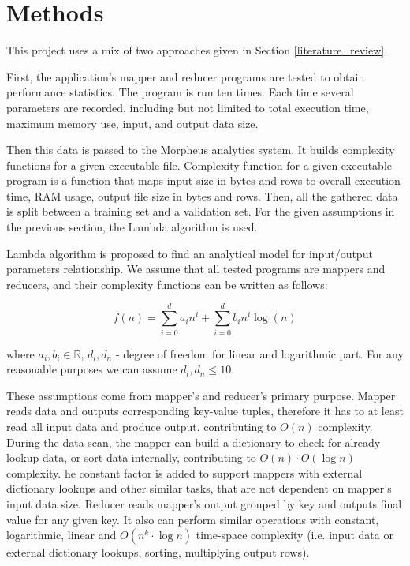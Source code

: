 \documentclass[conference]{IEEEtran} \IEEEoverridecommandlockouts
\begin{document}
    \section{Methods} 

    This project uses a mix of two approaches given in Section 
    \ref{literature_review}.

    First, the application's mapper and reducer programs are tested to obtain
    performance statistics. The program is run ten times. Each time several
    parameters are recorded, including but not limited to total execution time,
    maximum memory use, input, and output data size.

    Then this data is passed to the Morpheus analytics system. It builds
    complexity functions for a given executable file. Complexity function for a
    given executable program is a function that maps input size in bytes and
    rows to overall execution time, RAM usage, output file size in bytes and
    rows. Then, all the gathered data is split between a training set and a
    validation set. For the given assumptions in the previous section, the
    Lambda algorithm is used.

    Lambda algorithm is proposed to find an analytical model for input/output
    parameters relationship. We assume that all tested programs are mappers and
    reducers, and their complexity functions can be written as follows:
    
    \begin{equation} 
        f(n) = \sum_{i = 0}^d a_in^i + \sum_{i=0}^d b_in^i\log(n)
    \end{equation} 
    
    where $a_i, b_i \in \mathbb{R}$, $d_l, d_n$ - degree of freedom for linear 
    and logarithmic part. For any reasonable purposes we can assume 
    $d_l, d_n \leqslant 10$. 

    These assumptions come from mapper's and reducer's primary purpose. Mapper
    reads data and outputs corresponding key-value tuples, therefore it has to
    at least read all input data and produce output, contributing to $O(n)$
    complexity.  During the data scan, the mapper can build a dictionary to
    check for already lookup data, or sort data internally, contributing to
    $O(n)\cdot O(\log n)$ complexity.  he constant factor is added to support
    mappers with external dictionary lookups and other similar tasks, that are
    not dependent on mapper's input data size. Reducer reads mapper's output
    grouped by key and outputs final value for any given key.  It also can
    perform similar operations with constant, logarithmic, linear and $O(n^k
    \cdot \log n)$ time-space complexity (i.e. input data or external 
    dictionary lookups, sorting, multiplying output rows).
\end{document}
